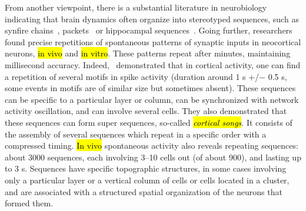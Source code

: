 \documentclass[brainsci, %
               review,accept,pdftex,moreauthors
               ]{Definitions/mdpi}
\begin{document}
From another viewpoint, there is a substantial literature in neurobiology indicating that brain dynamics often organize into stereotyped sequences, such as synfire chains~\citep{ikegaya_synfire_2004}, packets~\citep{luczak_sequential_2007} or hippocampal sequences~\citep{pastalkova_internally_2008}. %
Going further, researchers found precise repetitions of spontaneous patterns of synaptic inputs in neocortical neurons, {\hl{in vivo} %
} and {\hl{in vitro}}. These patterns repeat after minutes, maintaining millisecond accuracy. Indeed,~\citet{ikegaya_synfire_2004} demonstrated that in cortical activity, one can find a repetition of several motifs in spike activity (duration around 1 s +/$-$ 0.5 s, some events in motifs are of similar size but sometimes absent). These sequences can be specific to a particular layer or column, can be synchronized with network activity oscillation, and can involve several cells. They also demonstrated that these sequences can form super sequences, so-called \emph{\hl{cortical songs}}. It consists of the assembly of several sequences which repeat in a specific order with a compressed timing. {\hl{In vivo}} spontaneous activity also reveals repeating sequences: about 3000 sequences, each involving 3--10 cells out (of about 900), and lasting up to 3 s. Sequences have specific topographic structures, in some cases involving only a particular layer or a vertical column of cells or cells located in a cluster, and are associated with a structured spatial organization of the neurons that formed them. %
\end{document}
